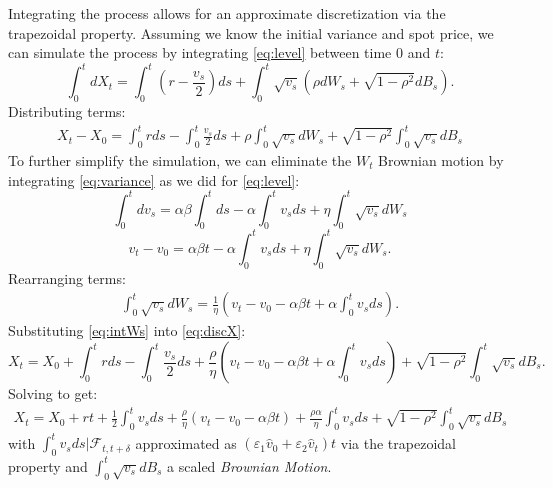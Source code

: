 \documentclass[letterpaper,11pt]{article}
\begin{document}
	Integrating the process allows for an approximate discretization via the trapezoidal property. Assuming we know the initial variance and spot price, we can simulate the process by integrating \eqref{eq:level} between time $0$ and $t$:
	\[
	\int_{0}^{t} dX_t = \int_{0}^{t} \left( r - \frac{v_s}{2} \right) ds + \int_{0}^{t} \sqrt{v_s} \left( \rho dW_s + \sqrt{1 - \rho^2} dB_s \right) .
	\]
	Distributing terms:
	\begin{align}
		X_t - X_0 = \int_{0}^{t} r ds - \int_{0}^{t} \frac{v_s}{2} ds + \rho \int_{0}^{t} \sqrt{v_s} dW_s + \sqrt{1-\rho^2} \int_{0}^{t} \sqrt{v_s} dB_s \label{eq:discX}
	\end{align}
	To further simplify the simulation, we can eliminate the $W_t$ Brownian motion by integrating \eqref{eq:variance} as we did for \eqref{eq:level}:
	\[
	\int_{0}^{t} dv_s = \alpha \beta \int_{0}^{t} ds - \alpha \int_{0}^{t} v_s ds + \eta \int_{0}^{t} \sqrt{v_s} dW_s
	\]
	\[
	v_t - v_0 = \alpha \beta t - \alpha \int_{0}^{t} v_s ds + \eta \int_{0}^{t} \sqrt{v_s} dW_s.
	\]
	Rearranging terms:
	\begin{align}
		\int_{0}^{t} \sqrt{v_s} dW_s = \frac{1}{\eta} \left( v_t - v_0 - \alpha \beta t + \alpha \int_{0}^{t} v_s ds \right). \label{eq:intWs}
	\end{align}
	Substituting \eqref{eq:intWs} into \eqref{eq:discX}:
	\[
	X_t = X_0 + \int_{0}^{t} r ds - \int_{0}^{t} \frac{v_s}{2} ds + \frac{\rho}{\eta} \left( v_t - v_0 - \alpha \beta t + \alpha \int_{0}^{t} v_s ds \right) + \sqrt{1-\rho^2} \int_{0}^{t} \sqrt{v_s} dB_s.
	\]
	Solving to get:
	\begin{align}
		X_t = X_0 + r t + \frac{1}{2} \int_{0}^{t} v_s ds  + \frac{\rho}{\eta} \left( v_t - v_0 - \alpha \beta t \right) + \frac{\rho \alpha}{\eta} \int_{0}^{t} v_s ds+ \sqrt{1-\rho^2} \int_{0}^{t} \sqrt{v_s} dB_s
	\end{align}
	with $\int_{0}^{t} v_s ds | \mathcal{F}_{t,t+\delta} $ approximated as $\left( \varepsilon_1 \hat{v}_0 + \varepsilon_2 \hat{v}_{t} \right)t$ via the trapezoidal property and $\int_{0}^{t} \sqrt{v_s} dB_s$ a scaled \emph{Brownian Motion}.
	
\end{document}
